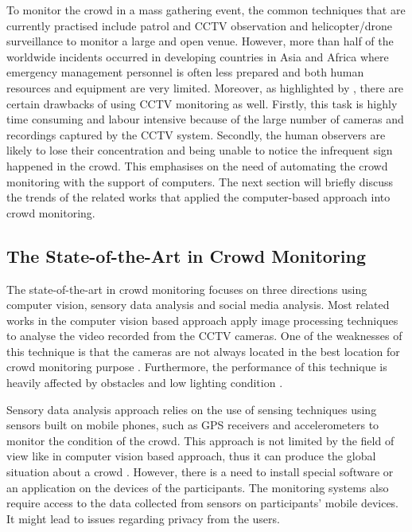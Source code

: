 To monitor the crowd in a mass gathering event, the common techniques that are currently practised include patrol and CCTV observation and helicopter/drone surveillance to monitor a large and open venue. However, more than half of the worldwide incidents occurred in developing countries in Asia and Africa \parencite{BurkleJr2011} where emergency management personnel is often less prepared and both human resources and equipment are very limited. Moreover, as highlighted by \textcite{Davies1995}, there are certain drawbacks of using CCTV monitoring as well. Firstly, this task is highly time consuming and labour intensive because of the large number of cameras and recordings captured by the CCTV system. Secondly, the human observers are likely to lose their concentration and being unable to notice the infrequent sign happened in the crowd. This emphasises on the need of automating the crowd monitoring with the support of computers. The next section will briefly discuss the trends of the related works that applied the computer-based approach into crowd monitoring.

\subsection{The State-of-the-Art in Crowd Monitoring}
The state-of-the-art in crowd monitoring focuses on three directions using computer vision, sensory data analysis and social media analysis. Most related works in the computer vision based approach apply image processing techniques to analyse the video recorded from the CCTV cameras. One of the weaknesses of this technique is that the cameras are not always located in the best location for crowd monitoring purpose \parencite{Davies1995}. Furthermore, the performance of this technique is heavily affected by obstacles and low lighting condition \parencite{Wirz2012}.

Sensory data analysis approach relies on the use of sensing techniques using sensors built on mobile phones, such as GPS receivers \parencite{Wirz2012} and accelerometers \parencite{Roggen2011} to monitor the condition of the crowd. This approach is not limited by the field of view like in computer vision based approach, thus it can produce the global situation about a crowd \parencite{Wirz2012}. However, there is a need to install special software or an application on the devices of the participants. The monitoring systems also require access to the data collected from sensors on participants' mobile devices. It might lead to issues regarding privacy from the users.

